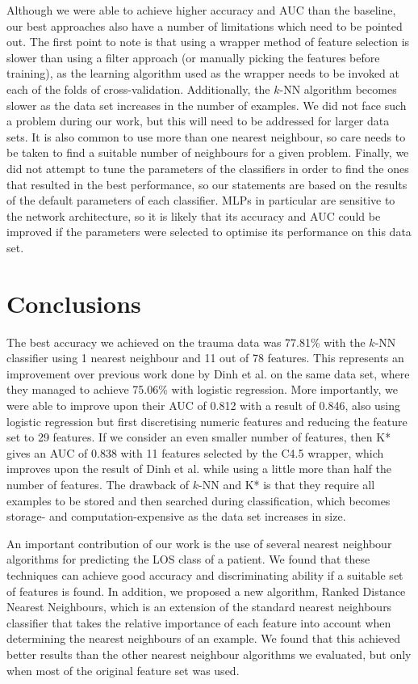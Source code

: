 \documentclass{article}
\begin{document}
Although we were able to achieve higher accuracy and AUC than the baseline,
our best approaches also have a number of limitations which need to be pointed
out. The first point to note is that using a wrapper method of feature
selection is slower than using a filter approach (or manually picking the
features before training), as the learning algorithm used as the wrapper
needs to be invoked at each of the folds of cross-validation. Additionally,
the $k$-NN algorithm becomes slower as the data set increases in the number
of examples. We did not face such a problem during our work, but this will
need to be addressed for larger data sets. It is also common to use more
than one nearest neighbour, so care needs to be taken to find a suitable number
of neighbours for a given problem. Finally, we did not
attempt to tune the parameters of the classifiers in order to find the ones
that resulted in the best performance, so our statements are based on the
results of the default parameters of each classifier.
MLPs in particular are sensitive to
the network architecture, so it is likely that its accuracy and AUC could be
improved if the parameters were selected to optimise its performance on this
data set.

\section{Conclusions}
\label{sec:conclusions}
The best accuracy we achieved on the trauma data was 77.81\% with the $k$-NN
classifier using 1 nearest neighbour and 11 out of 78 features. This represents
an improvement over previous work done by Dinh et al. \cite{Dinh2013a}
on the same data set,
where they managed to achieve 75.06\% with logistic regression. More
importantly, we were able to improve upon their AUC of 0.812 with a result of
0.846, also using logistic regression but first discretising numeric features
and reducing the feature set to 29 features.
If we consider an even smaller number of features, then K*
gives an AUC of 0.838 with 11 features selected by the C4.5 wrapper, which
improves upon the result of Dinh et al. \cite{Dinh2013a} while using a little
more than half
the number of features. The drawback of $k$-NN and K* is that they require all
examples to be stored and then searched during classification, which becomes
storage- and computation-expensive as the data set increases in size.

An important contribution of our work is the use of several nearest neighbour
algorithms for predicting the LOS class of a patient. We found that these
techniques can achieve good accuracy and discriminating ability if a suitable
set of features is found. In addition, we proposed a new algorithm, Ranked
Distance Nearest Neighbours, which is an extension of the standard nearest
neighbours classifier that takes the relative importance
of each feature into account when determining the nearest neighbours of an
example. We found that this achieved better results than the other nearest
neighbour algorithms we evaluated, but only when most of the original feature
set was used.
\end{document}
